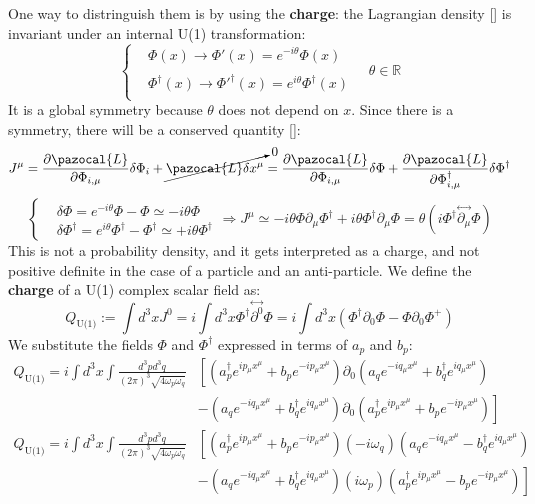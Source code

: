 \documentclass[../main.tex]{subfiles}
\begin{document}
One way to distringuish them is by using the \textbf{charge}: the Lagrangian density [] is invariant under an internal U(1) transformation:
\[
\left\{
\begin{aligned}
&\Phi(x)\xrightarrow[]{}\Phi'(x)=e^{-i\theta}\Phi(x)\\
&\Phi^\dagger(x)\xrightarrow[]{}\Phi'^\dagger(x)=e^{i\theta}\Phi^\dagger(x)
\end{aligned}
\right.
\quad \theta\in\mathbb{R}
\]
It is a global symmetry because $\theta$ does not depend on $x$. Since there is a symmetry, there will be a conserved quantity []:
\[
J^\mu=\frac{\partial\pazocal{L}}{\partial\Phi_{i,\mu}}\delta\Phi_i+\cancelto{0}{\pazocal{L}\delta x^\mu}=\frac{\partial\pazocal{L}}{\partial\Phi_{i,\mu}}\delta\Phi+\frac{\partial\pazocal{L}}{\partial\Phi^\dagger_{i,\mu}}\delta\Phi^\dagger
\]
\[
\left\{
\begin{aligned}
&\delta\Phi=e^{-i\theta}\Phi-\Phi\simeq-i\theta\Phi\\
&\delta\Phi^\dagger=e^{i\theta}\Phi^\dagger-\Phi^\dagger\simeq+i\theta\Phi^\dagger
\end{aligned}
\right.
\Rightarrow J^\mu\simeq-i\theta\Phi\partial_\mu\Phi^\dagger+i\theta\Phi^\dagger\partial_\mu\Phi=\theta(i\Phi^\dagger\overset{\leftrightarrow}{\partial_\mu}\Phi)
\]
This is not a probability density, and it gets interpreted as a charge, and not positive definite in the case of a particle and an anti-particle. We define the \textbf{charge} of a U(1) complex scalar field as:
\[
Q_{\text{U(1)}}:=\int d^3xJ^0=i\int d^3x\Phi^\dagger\overset{\leftrightarrow}{\partial^0}\Phi=i\int d^3x(\Phi^\dagger\partial_0\Phi-\Phi\partial_0\Phi^+)
\]
We substitute the fields $\Phi$ and $\Phi^\dagger$ expressed in terms of $a_p$ and $b_p$:
\begin{align*}
Q_{\text{U(1)}}=i\int d^3x\int \frac{d^3pd^3q}{(2\pi)^3\sqrt{4\omega_p\omega_q}}&\left[(a^\dagger_pe^{ip_\mu x^\mu}+b_pe^{-ip_\mu x^\mu})\partial_0(a_qe^{-iq_\mu x^\mu}+b^\dagger_qe^{iq_\mu x^\mu})\right.\\
&\left.-(a_qe^{-iq_\mu x^\mu}+b^\dagger_qe^{iq_\mu x^\mu})\partial_0(a^\dagger_pe^{ip_\mu x^\mu}+b_pe^{-ip_\mu x^\mu})\right]\\
Q_{\text{U(1)}}=i\int d^3x\int \frac{d^3pd^3q}{(2\pi)^3\sqrt{4\omega_p\omega_q}}&\left[(a^\dagger_pe^{ip_\mu x^\mu}+b_pe^{-ip_\mu x^\mu})(-i\omega_q)(a_qe^{-iq_\mu x^\mu}-b^\dagger_qe^{iq_\mu x^\mu})\right.\\
&\left.-(a_qe^{-iq_\mu x^\mu}+b^\dagger_qe^{iq_\mu x^\mu})(i\omega_p)(a^\dagger_pe^{ip_\mu x^\mu}-b_pe^{-ip_\mu x^\mu})\right]
\end{align*}
\end{document}
